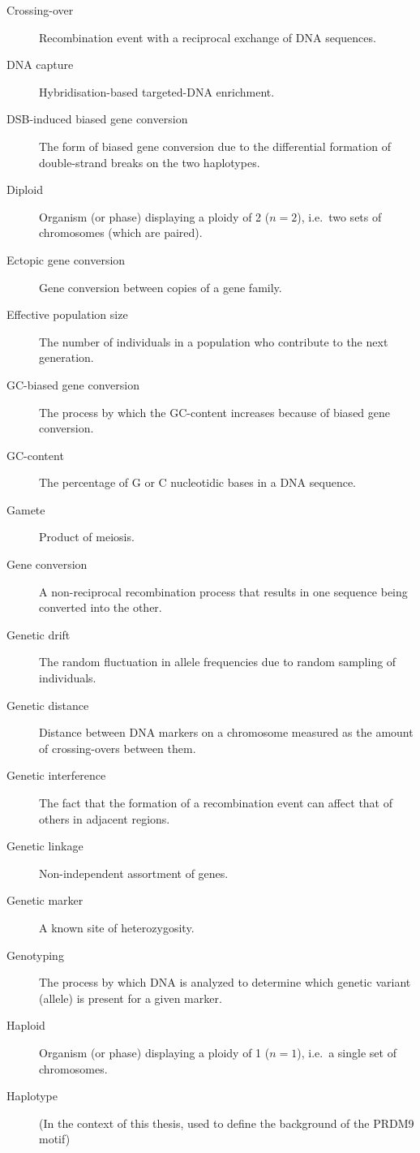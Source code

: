\begin{alwayssingle}
\begin{description}
		\item[Crossing-over] Recombination event with a reciprocal exchange of DNA sequences.
		\item[DNA capture] Hybridisation-based targeted-DNA enrichment.
		\item[DSB-induced biased gene conversion] The form of biased gene conversion due to the differential formation of double-strand breaks on the two haplotypes.
		\item[Diploid] Organism (or phase) displaying a ploidy of 2 ($n=2$), i.e.\ two sets of chromosomes (which are paired).
		\item[Ectopic gene conversion] Gene conversion between copies of a gene family.
		\item[Effective population size] The number of individuals in a population who contribute to the next generation.
		\item[GC-biased gene conversion] The process by which the GC-content increases because of biased gene conversion.
		\item[GC-content] The percentage of G or C nucleotidic bases in a DNA sequence.
		\item[Gamete] Product of meiosis.
		\item[Gene conversion] A non-reciprocal recombination process that results in one sequence being converted into the other.
		\item[Genetic drift] The random fluctuation in allele frequencies due to random sampling of individuals.
		\item[Genetic distance] Distance between DNA markers on a chromosome measured as the amount of crossing-overs between them.
		\item[Genetic interference] The fact that the formation of a recombination event can affect that of others in adjacent regions.
		\item[Genetic linkage] Non-independent assortment of genes.
		\item[Genetic marker] A known site of heterozygosity.
		\item[Genotyping] The process by which DNA is analyzed to determine which genetic variant (allele) is present for a given marker.
		\item[Haploid] Organism (or phase) displaying a ploidy of 1 ($n=1$), i.e.\ a single set of chromosomes.
		\item[Haplotype] (In the context of this thesis, used to define the background of the PRDM9 motif)

\end{description}
\end{alwayssingle}
